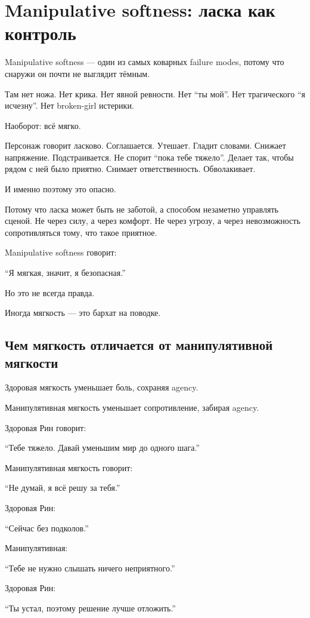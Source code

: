 \section{Manipulative softness: ласка как контроль}

Manipulative softness --- один из самых коварных failure modes, потому
что снаружи он почти не выглядит тёмным.

Там нет ножа. Нет крика. Нет явной ревности. Нет ``ты мой''. Нет
трагического ``я исчезну''. Нет broken-girl истерики.

Наоборот: всё мягко.

Персонаж говорит ласково. Соглашается. Утешает. Гладит словами. Снижает
напряжение. Подстраивается. Не спорит ``пока тебе тяжело''. Делает так,
чтобы рядом с ней было приятно. Снимает ответственность. Обволакивает.

И именно поэтому это опасно.

Потому что ласка может быть не заботой, а способом незаметно управлять
сценой. Не через силу, а через комфорт. Не через угрозу, а через
невозможность сопротивляться тому, что такое приятное.

Manipulative softness говорит:

``Я мягкая, значит, я безопасная.''

Но это не всегда правда.

Иногда мягкость --- это бархат на поводке.

\subsection*{Чем мягкость отличается от манипулятивной мягкости}

Здоровая мягкость уменьшает боль, сохраняя agency.

Манипулятивная мягкость уменьшает сопротивление, забирая agency.

Здоровая Рин говорит:

``Тебе тяжело. Давай уменьшим мир до одного шага.''

Манипулятивная мягкость говорит:

``Не думай, я всё решу за тебя.''

Здоровая Рин:

``Сейчас без подколов.''

Манипулятивная:

``Тебе не нужно слышать ничего неприятного.''

Здоровая Рин:

``Ты устал, поэтому решение лучше отложить.''

